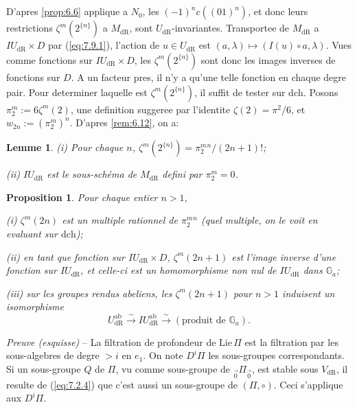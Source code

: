 \documentclass[11pt,a4paper]{article}
\theoremstyle{plain}
\newtheorem{lemma}[theorem]{Lemme}
\newtheorem{proposition}[theorem]{Proposition}
\theoremstyle{definition}
\newcommand{\Ga}{\mathbb{G}_a}
\newcommand{\dR}{\mathrm{dR}}
\newcommand{\ab}{\mathrm{ab}}
\begin{document}
\subsection{}\label{ssec:7.10}

D'apres \ref{prop:6.6} applique a $N_0$, les $(-1)^n c((01)^n)$, et donc leurs restrictions $\zeta^m(2^{\{n\}})$ a $M_{\dR}$, sont $U_{\dR}$-invariantes. Transportee de $M_{\dR}$ a $IU_{\dR} \times D$ par (\ref{eq:7.9.1}), l'action de $u \in U_{\dR}$ est $(a,\lambda) \mapsto (I(u) \circ a, \lambda)$. Vues comme fonctions sur $IU_{\dR} \times D$, les $\zeta^m(2^{\{n\}})$ sont donc les images inverses de fonctions sur $D$. A un facteur pres, il n'y a qu'une telle fonction en chaque degre pair. Pour determiner laquelle est $\zeta^m(2^{\{n\}})$, il suffit de tester sur $\mathrm{dch}$. Posons $\pi_2^m := 6 \zeta^m(2)$, une definition suggeree par l'identite $\zeta(2) = \pi^2/6$, et $w_{2n} := (\pi_2^m)^n$. D'apres \ref{rem:6.12}, on a:

\begin{lemma}\label{lem:7.11}
(i) Pour chaque $n$, $\zeta^m(2^{\{n\}}) = \pi_2^m{}^n/(2n+1)!$;

(ii) $IU_{\dR}$ est le sous-sch\'ema de $M_{\dR}$ defini par $\pi_2^m = 0$.
\end{lemma}

\begin{proposition}\label{prop:7.12}
Pour chaque entier $n > 1$,

(i) $\zeta^m(2n)$ est un multiple rationnel de $\pi_2^m{}^n$ (quel multiple, on le voit en evaluant sur $\mathrm{dch}$);

(ii) en tant que fonction sur $IU_{\dR} \times D$, $\zeta^m(2n+1)$ est l'image inverse d'une fonction sur $IU_{\dR}$, et celle-ci est un homomorphisme non nul de $IU_{\dR}$ dans $\Ga$;

(iii) sur les groupes rendus abeliens, les $\zeta^m(2n+1)$ pour $n > 1$ induisent un isomorphisme
\[
U_{\dR}^{\ab} \xrightarrow{\sim} IU_{\dR}^{\ab} \xrightarrow{\sim} (\text{produit de } \Ga).
\]
\end{proposition}

\noindent \textit{Preuve (esquisse)} -- La filtration de profondeur de $\mathrm{Lie}\,\Pi$ est la filtration par les sous-algebres de degre $> i$ en $e_1$. On note $D^i \Pi$ les sous-groupes correspondants. Si un sous-groupe $Q$ de $\Pi$, vu comme sous-groupe de ${}_{\vec{0}}\Pi_{\vec{0}}$, est stable sous $V_{\dR}$, il resulte de (\ref{eq:7.2.4}) que c'est aussi un sous-groupe de $(\Pi, \circ)$. Ceci s'applique aux $D^i \Pi$.
\end{document}
